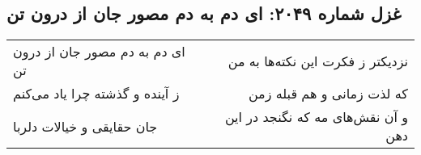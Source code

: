 \begin{center}
\section*{غزل شماره ۲۰۴۹: ای دم به دم مصور جان از درون تن}
\label{sec:2049}
\begin{longtable}{l p{0.5cm} r}
ای دم به دم مصور جان از درون تن
&&
نزدیکتر ز فکرت این نکته‌ها به من
\\
ز آینده و گذشته چرا یاد می‌کنم
&&
که لذت زمانی و هم قبله زمن
\\
جان حقایقی و خیالات دلربا
&&
و آن نقش‌های مه که نگنجد در این دهن
\\
\end{longtable}
\end{center}
